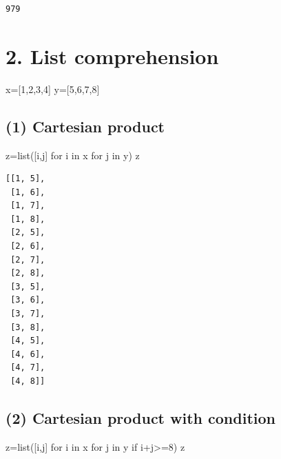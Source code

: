 \documentclass[
  letterpaper,
  DIV=11,
  numbers=noendperiod]{scrreprt}
\newenvironment{Shaded}{\begin{snugshade}}{\end{snugshade}}
\newcommand{\BuiltInTok}[1]{\textcolor[rgb]{0.00,0.23,0.31}{#1}}
\newcommand{\ControlFlowTok}[1]{\textcolor[rgb]{0.00,0.23,0.31}{#1}}
\newcommand{\DecValTok}[1]{\textcolor[rgb]{0.68,0.00,0.00}{#1}}
\newcommand{\KeywordTok}[1]{\textcolor[rgb]{0.00,0.23,0.31}{#1}}
\newcommand{\NormalTok}[1]{\textcolor[rgb]{0.00,0.23,0.31}{#1}}
\newcommand{\OperatorTok}[1]{\textcolor[rgb]{0.37,0.37,0.37}{#1}}
\begin{document}
\begin{verbatim}
979
\end{verbatim}

\section*{2. List comprehension}\label{list-comprehension}


\begin{Shaded}
\begin{Highlighting}[]
\NormalTok{x}\OperatorTok{=}\NormalTok{[}\DecValTok{1}\NormalTok{,}\DecValTok{2}\NormalTok{,}\DecValTok{3}\NormalTok{,}\DecValTok{4}\NormalTok{]}
\NormalTok{y}\OperatorTok{=}\NormalTok{[}\DecValTok{5}\NormalTok{,}\DecValTok{6}\NormalTok{,}\DecValTok{7}\NormalTok{,}\DecValTok{8}\NormalTok{]}
\end{Highlighting}
\end{Shaded}

\subsection*{(1) Cartesian product}\label{cartesian-product}

\begin{Shaded}
\begin{Highlighting}[]
\NormalTok{z}\OperatorTok{=}\BuiltInTok{list}\NormalTok{([i,j] }\ControlFlowTok{for}\NormalTok{ i }\KeywordTok{in}\NormalTok{ x }\ControlFlowTok{for}\NormalTok{ j }\KeywordTok{in}\NormalTok{ y)}
\NormalTok{z}
\end{Highlighting}
\end{Shaded}

\begin{verbatim}
[[1, 5],
 [1, 6],
 [1, 7],
 [1, 8],
 [2, 5],
 [2, 6],
 [2, 7],
 [2, 8],
 [3, 5],
 [3, 6],
 [3, 7],
 [3, 8],
 [4, 5],
 [4, 6],
 [4, 7],
 [4, 8]]
\end{verbatim}

\subsection*{(2) Cartesian product with
condition}\label{cartesian-product-with-condition}

\begin{Shaded}
\begin{Highlighting}[]
\NormalTok{z}\OperatorTok{=}\BuiltInTok{list}\NormalTok{([i,j] }\ControlFlowTok{for}\NormalTok{ i }\KeywordTok{in}\NormalTok{ x }\ControlFlowTok{for}\NormalTok{ j }\KeywordTok{in}\NormalTok{ y }\ControlFlowTok{if}\NormalTok{ i}\OperatorTok{+}\NormalTok{j}\OperatorTok{\textgreater{}=}\DecValTok{8}\NormalTok{)}
\NormalTok{z}
\end{Highlighting}
\end{Shaded}
\end{document}
